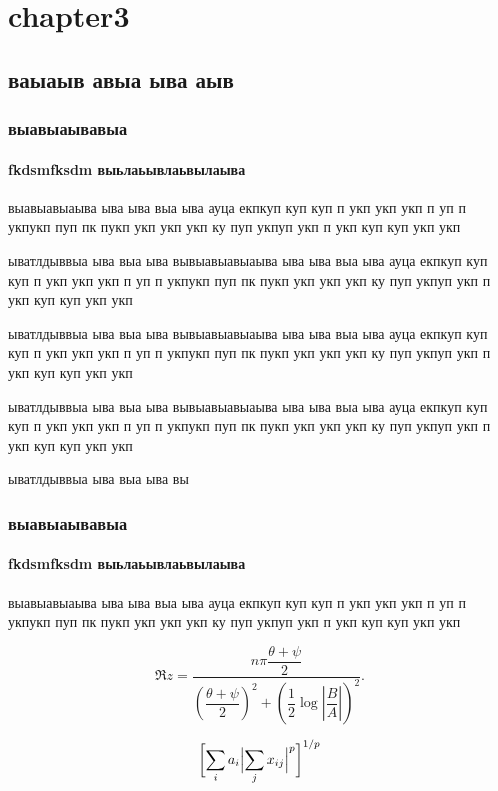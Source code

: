\documentclass{khaireport}
\begin{document}
\chapter{chapter3}
\section{ваыаыв авыа ыва аыв}
\subsection{выавыаывавыа}
\subsubsection{fkdsmfksdm выьлаьывлаьвылаыва}
выавыавыаыва ыва ыва выа ыва ауца екпкуп
куп куп п укп укп укп п уп п укпукп
пуп  пк пукп укп укп укп ку пуп укпуп укп
п укп куп куп укп укп

ыватлдыввыа ыва выа ыва вывыавыавыаыва ыва ыва выа ыва ауца екпкуп
куп куп п укп укп укп п уп п укпукп
пуп  пк пукп укп укп укп ку пуп укпуп укп
п укп куп куп укп укп

ыватлдыввыа ыва выа ыва вывыавыавыаыва ыва ыва выа ыва ауца екпкуп
куп куп п укп укп укп п уп п укпукп
пуп  пк пукп укп укп укп ку пуп укпуп укп
п укп куп куп укп укп

ыватлдыввыа ыва выа ыва вывыавыавыаыва ыва ыва выа ыва ауца екпкуп
куп куп п укп укп укп п уп п укпукп
пуп  пк пукп укп укп укп ку пуп укпуп укп
п укп куп куп укп укп

ыватлдыввыа ыва выа ыва вы

\subsection{выавыаывавыа}
\subsubsection{fkdsmfksdm выьлаьывлаьвылаыва}
выавыавыаыва ыва ыва выа ыва ауца екпкуп
куп куп п укп укп укп п уп п укпукп
пуп  пк пукп укп укп укп ку пуп укпуп укп
п укп куп куп укп укп

\begin{equation}
\Re{z} =\frac{n\pi \dfrac{\theta +\psi}{2}}{
\left(\dfrac{\theta +\psi}{2}\right)^2 + \left( \dfrac{1}{2}
\log \left\lvert\dfrac{B}{A}\right\rvert\right)^2}.
\end{equation}

\begin{equation}
\biggl[\sum_i a_i\Bigl\lvert\sum_j x_{ij}\Bigr\rvert^p\biggr]^{1/p}
\end{equation}
\end{document}
